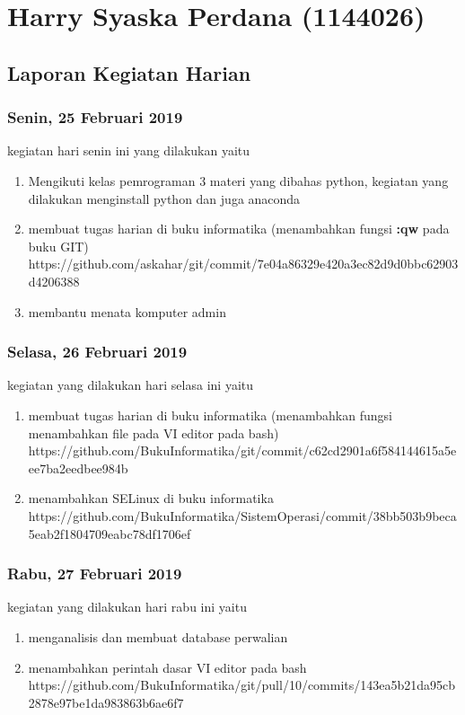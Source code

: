 \chapter{Harry Syaska Perdana (1144026)}
\section{Laporan Kegiatan Harian}
\subsection{Senin, 25 Februari 2019}
kegiatan hari senin ini yang dilakukan yaitu
\begin{enumerate}
\item Mengikuti kelas pemrograman 3 materi yang dibahas python, kegiatan yang dilakukan menginstall python dan juga anaconda
\item membuat tugas harian di buku informatika (menambahkan fungsi \textbf{:qw} pada buku GIT)   
\subitem https://github.com/askahar/git/commit/7e04a86329e420a3ec82d9d0bbc62903d4206388
\item membantu menata komputer admin
\end{enumerate}

\subsection{Selasa, 26 Februari 2019}
kegiatan yang dilakukan hari selasa ini yaitu
\begin{enumerate}
\item  membuat tugas harian di buku informatika (menambahkan fungsi menambahkan file pada VI editor pada bash)
\subitem https://github.com/BukuInformatika/git/commit/c62cd2901a6f584144615a5eee7ba2eedbee984b 
\item menambahkan SELinux di buku informatika 
\subitem https://github.com/BukuInformatika/SistemOperasi/commit/38bb503b9beca5eab2f1804709eabc78df1706ef
\end{enumerate}

\subsection{Rabu, 27 Februari 2019}
kegiatan yang dilakukan hari rabu ini yaitu
\begin{enumerate}
\item menganalisis dan membuat database perwalian 
\item menambahkan perintah dasar VI editor pada bash
\subitem https://github.com/BukuInformatika/git/pull/10/commits/143ea5b21da95cb2878e97be1da983863b6ae6f7
\end{enumerate}

